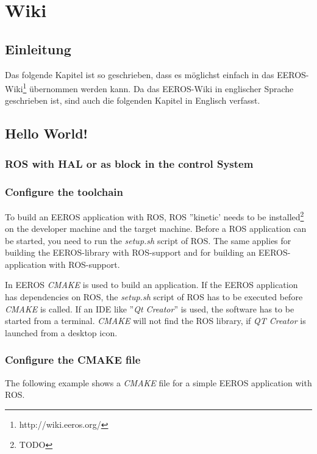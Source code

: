 \chapter{Wiki}
\section{Einleitung}
Das folgende Kapitel ist so geschrieben, dass es möglichst einfach in das EEROS-Wiki\footnote{http://wiki.eeros.org/} übernommen werden kann.
Da das EEROS-Wiki in englischer Sprache geschrieben ist, sind auch die folgenden Kapitel in Englisch verfasst.


\section{Hello World!}


\subsection{ROS with HAL or as block in the control System}



\subsection{Configure the toolchain}										%
To build an EEROS application with ROS, ROS ''kinetic' needs to be installed\footnote{TODO} on the developer machine and the target machine.
Before a ROS application can be started, you need to run the \textit{setup.sh} script of ROS.
The same applies for building the EEROS-library with ROS-support and for building an EEROS-application with ROS-support. %

In EEROS \textit{CMAKE} is used to build an application.
If the EEROS application has dependencies on ROS, the \textit{setup.sh} script of ROS has to be executed before \textit{CMAKE} is called.
If an IDE like ''\textit{Qt Creator}'' is used, the software has to be started from a terminal.
\textit{CMAKE} will not find the ROS library, if \textit{QT Creator} is launched from a desktop icon.

\subsection{Configure the CMAKE file}
The following example shows a \textit{CMAKE} file for a simple EEROS application with ROS.

